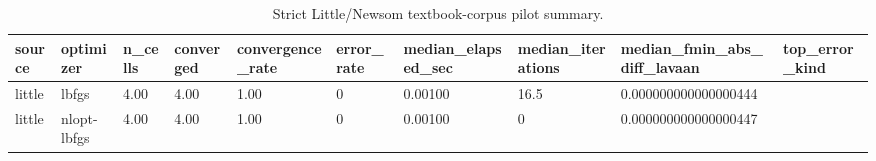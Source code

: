 \begin{table}[ht]
\centering
\caption{Strict Little/Newsom textbook-corpus pilot summary.}
\begin{tabular}{llllllllll}
\hline
source & optimizer & n\_cells & converged & convergence\_rate & error\_rate & median\_elapsed\_sec & median\_iterations & median\_fmin\_abs\_diff\_lavaan & top\_error\_kind
\\ \hline
little & lbfgs & 4.00 & 4.00 & 1.00 & 0 & 0.00100 & 16.5 & 0.000000000000000444 &  \\
little & nlopt-lbfgs & 4.00 & 4.00 & 1.00 & 0 & 0.00100 & 0 & 0.000000000000000447 &  \\
\hline
\end{tabular}
\end{table}
